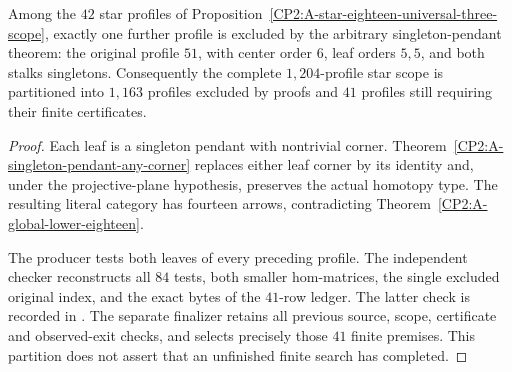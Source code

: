 \begin{proposition}
\label{CP2:A-star-eighteen-any-pendant-scope}
Among the $42$ star profiles of
Proposition~\ref{CP2:A-star-eighteen-universal-three-scope},
exactly one further profile is excluded by the arbitrary
singleton-pendant theorem: the original profile $51$, with
center order $6$, leaf orders $5,5$, and both stalks singletons.
Consequently the complete $1,204$-profile star scope is
partitioned into $1,163$ profiles excluded by proofs and
$41$ profiles still requiring their finite certificates.
\end{proposition}
\begin{proof}
Each leaf is a singleton pendant with nontrivial corner.
Theorem~\ref{CP2:A-singleton-pendant-any-corner} replaces
either leaf corner by its identity and, under the
projective-plane hypothesis, preserves the actual homotopy
type. The resulting literal category has fourteen arrows,
contradicting Theorem~\ref{CP2:A-global-lower-eighteen}.

The producer 
tests both leaves of every preceding profile. The independent
checker 
reconstructs all $84$ tests, both smaller hom-matrices, the
single excluded original index, and the exact bytes of the
$41$-row ledger. The latter check is recorded in
.
The separate finalizer
retains all previous source, scope, certificate and observed-exit
checks, and selects precisely those $41$ finite premises.
This partition does not assert that an unfinished finite
search has completed.
\end{proof}
